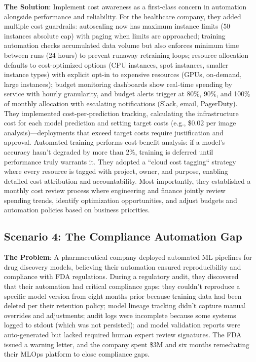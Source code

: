 \textbf{The Solution}: Implement cost awareness as a first-class concern in automation alongside performance and reliability. For the healthcare company, they added multiple cost guardrails: autoscaling now has maximum instance limits (50 instances absolute cap) with paging when limits are approached; training automation checks accumulated data volume but also enforces minimum time between runs (24 hours) to prevent runaway retraining loops; resource allocation defaults to cost-optimized options (CPU instances, spot instances, smaller instance types) with explicit opt-in to expensive resources (GPUs, on-demand, large instances); budget monitoring dashboards show real-time spending by service with hourly granularity, and budget alerts trigger at 80\%, 90\%, and 100\% of monthly allocation with escalating notifications (Slack, email, PagerDuty). They implemented cost-per-prediction tracking, calculating the infrastructure cost for each model prediction and setting target costs (e.g., \$0.02 per image analysis)---deployments that exceed target costs require justification and approval. Automated training performs cost-benefit analysis: if a model's accuracy hasn't degraded by more than 2\%, training is deferred until performance truly warrants it. They adopted a ``cloud cost tagging`` strategy where every resource is tagged with project, owner, and purpose, enabling detailed cost attribution and accountability. Most importantly, they established a monthly cost review process where engineering and finance jointly review spending trends, identify optimization opportunities, and adjust budgets and automation policies based on business priorities.

\subsection{Scenario 4: The Compliance Automation Gap}

\textbf{The Problem}: A pharmaceutical company deployed automated ML pipelines for drug discovery models, believing their automation ensured reproducibility and compliance with FDA regulations. During a regulatory audit, they discovered that their automation had critical compliance gaps: they couldn't reproduce a specific model version from eight months prior because training data had been deleted per their retention policy; model lineage tracking didn't capture manual overrides and adjustments; audit logs were incomplete because some systems logged to stdout (which was not persisted); and model validation reports were auto-generated but lacked required human expert review signatures. The FDA issued a warning letter, and the company spent \$3M and six months remediating their MLOps platform to close compliance gaps.

